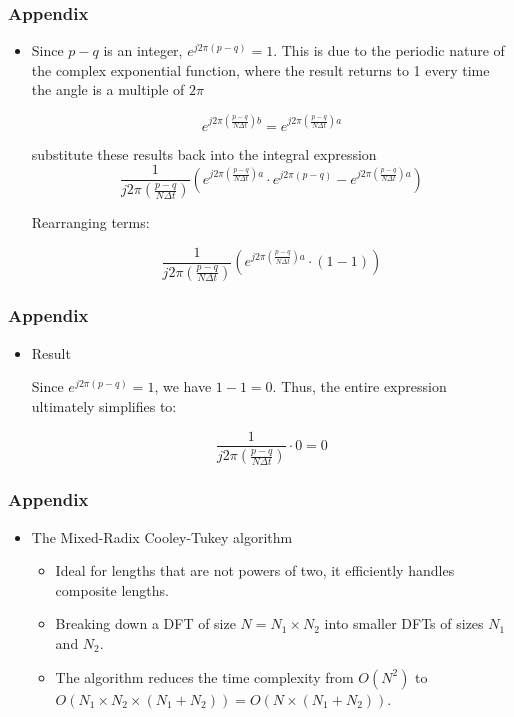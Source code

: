 \documentclass[xcolor=dvipsnames,aspectratio=169]{beamer} %
\begin{document}
\begin{frame}
\frametitle{Appendix}
\begin{itemize}
  \item Since \(p - q\) is an integer, \(e^{j2\pi (p-q)} = 1\). This is due to the periodic nature of the complex exponential function, where the result returns to 1 every time the angle is a multiple of \(2\pi\)
  
    \[
    e^{j2\pi \left( \frac{p-q}{N\Delta t} \right) b} = e^{j2\pi \left( \frac{p-q}{N\Delta t} \right) a}
    \]

    substitute these results back into the integral expression
    \[
    \frac{1}{j2\pi \left( \frac{p-q}{N\Delta t} \right)} \left( e^{j2\pi \left( \frac{p-q}{N\Delta t} \right) a} \cdot e^{j2\pi (p-q)} - e^{j2\pi \left( \frac{p-q}{N\Delta t} \right) a} \right)
    \]


    Rearranging terms:

     \[
    \frac{1}{j2\pi \left( \frac{p-q}{N\Delta t} \right)} \left( e^{j2\pi \left( \frac{p-q}{N\Delta t} \right) a} \cdot (1 - 1) \right)
    \]


\end{itemize}
\end{frame}
\begin{frame}
\frametitle{Appendix}
\begin{itemize}
  \item Result
  
  Since \(e^{j2\pi (p-q)} = 1\), we have \(1 - 1 = 0\). Thus, the entire expression ultimately simplifies to:


    \[
    \frac{1}{j2\pi \left( \frac{p-q}{N\Delta t} \right)} \cdot 0 = 0
    \]

\end{itemize}
\end{frame}


\begin{frame}
\frametitle{Appendix}
\setlength{\itemsep}{8pt}
\begin{itemize}
          
    \item The Mixed-Radix Cooley-Tukey algorithm
    \begin{itemize}
        \setlength{\itemsep}{4pt}
        \item Ideal for lengths that are not powers of two, it efficiently handles composite lengths.
        \item Breaking down a DFT of size $N = N_1 \times N_2$ into smaller DFTs of sizes $N_1$ and $N_2$.
        \item The algorithm reduces the time complexity from \(O(N^2)\) to \(O\left(N_1 \times N_2 \times (N_1 + N_2)\right) = O(N \times (N_1 + N_2))\).
    \end{itemize}
 
\end{itemize}
\end{frame}
\end{document}
